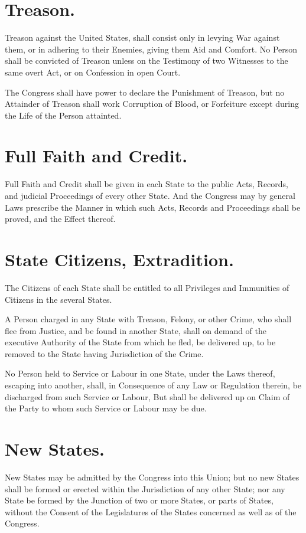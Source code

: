 \documentclass[12pt]{constitution}
\begin{document}
\section{Treason.}
Treason against the United States, shall consist only in levying War against
them, or in adhering to their Enemies, giving them Aid and Comfort. No Person
shall be convicted of Treason unless on the Testimony of two Witnesses to the
same overt Act, or on Confession in open Court.

The Congress shall have power to declare the Punishment of Treason, but no
Attainder of Treason shall work Corruption of Blood, or Forfeiture except
during the Life of the Person attainted.




\section{Full Faith and Credit.}
Full Faith and Credit shall be given in each State to the public Acts, Records,
and judicial Proceedings of every other State. And the Congress may by general
Laws prescribe the Manner in which such Acts, Records and Proceedings shall be
proved, and the Effect thereof.


\section{State Citizens, Extradition.}
The Citizens of each State shall be entitled to all Privileges and Immunities
of Citizens in the several States.

A Person charged in any State with Treason, Felony, or other Crime, who shall
flee from Justice, and be found in another State, shall on demand of the
executive Authority of the State from which he fled, be delivered up, to be
removed to the State having Jurisdiction of the Crime.

No Person held to Service or Labour in one State, under the Laws thereof,
escaping into another, shall, in Consequence of any Law or Regulation therein,
be discharged from such Service or Labour, But shall be delivered up on Claim
of the Party to whom such Service or Labour may be due.


\section{New States.}
New States may be admitted by the Congress into this Union; but no new States
shall be formed or erected within the Jurisdiction of any other State; nor any
State be formed by the Junction of two or more States, or parts of States,
without the Consent of the Legislatures of the States concerned as well as of
the Congress.
\end{document}
